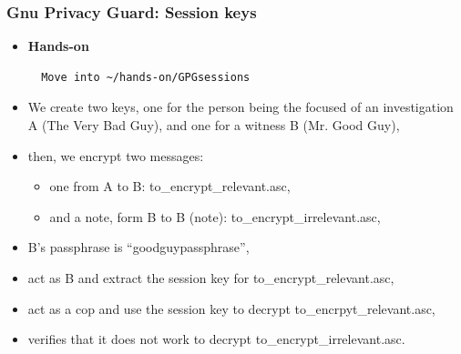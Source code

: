 \begin{frame}[fragile]
  \frametitle{Gnu Privacy Guard: Session keys}

  \begin{itemize}
    \item {\bf Hands-on}
  \begin{lstlisting}
  Move into ~/hands-on/GPGsessions
  \end{lstlisting}
    \item We create two keys, one for the person being the focused of an
      investigation A (The Very Bad Guy), and one for a witness B (Mr. Good Guy),
    \item then, we encrypt two messages:
      \begin{itemize}
       \item one from A to B: to\_encrypt\_relevant.asc,
       \item and a note, form B to B (note): to\_encrypt\_irrelevant.asc, 
      \end{itemize}
    \item B's passphrase is ``goodguypassphrase'',
    \item act as B and extract the session key for to\_encrypt\_relevant.asc,
    \item act as a cop and use the session key to decrypt
      to\_encrpyt\_relevant.asc,
    \item verifies that it does not work to decrypt to\_encrypt\_irrelevant.asc.
  \end{itemize}
\end{frame}
